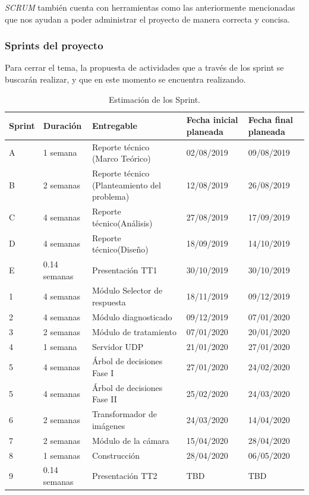 \documentclass[10pt]{article}
\begin{document}
\textit{SCRUM} también cuenta con herramientas como las anteriormente mencionadas que nos ayudan a poder administrar el proyecto de manera correcta y concisa.

\subsubsection{Sprints del proyecto}
Para cerrar el tema, la propuesta de actividades que a través de los sprint se buscarán realizar, y que en este momento se encuentra realizando.

\begin{table}[htbp]
\begin{center}
\begin{tabular}{|p{1.0cm}|p{1.8cm}|p{4.8cm}|p{2.5cm}|p{2.5cm}|}
\hline
Sprint & Duración & Entregable &Fecha inicial planeada & Fecha final planeada \\
\hline
A & 1 semana & Reporte técnico (Marco Teórico) & 02/08/2019 & 09/08/2019 \\
\hline
B &  2 semanas & Reporte técnico (Planteamiento del problema) & 12/08/2019 & 26/08/2019\\
\hline
C &  4 semanas  & Reporte técnico(Análisis) & 27/08/2019 & 17/09/2019\\
\hline
D & 4 semanas &Reporte técnico(Diseño) & 18/09/2019 & 14/10/2019\\
\hline
E & 0.14 semanas &Presentación TT1 &  30/10/2019 & 30/10/2019\\
\hline
1 & 4 semanas &Módulo Selector de respuesta & 18/11/2019 & 09/12/2019\\
\hline
2 & 4 semanas&Módulo diagnosticado & 09/12/2019 & 07/01/2020\\
\hline
3 & 2 semanas&Módulo de tratamiento & 07/01/2020 & 20/01/2020\\
\hline
4 & 1 semana&Servidor UDP & 21/01/2020 & 27/01/2020\\
\hline
5 & 4 semanas& Árbol de decisiones Fase I & 27/01/2020 & 24/02/2020\\
\hline
5 & 4 semanas& Árbol de decisiones Fase II& 25/02/2020 & 24/03/2020\\
\hline
6 & 2 semanas&Transformador de imágenes & 24/03/2020 & 14/04/2020\\
\hline
7 & 2 semanas& Módulo de la cámara & 15/04/2020 & 28/04/2020\\
\hline
8 & 1 semanas& Construcción & 28/04/2020 & 06/05/2020\\
\hline
9 & 0.14 semanas& Presentación TT2 & TBD & TBD\\
\hline
\end{tabular}
\caption{Estimación de los Sprint.}
\label{tabla1}
\end{center}
\end{table}
\end{document}
